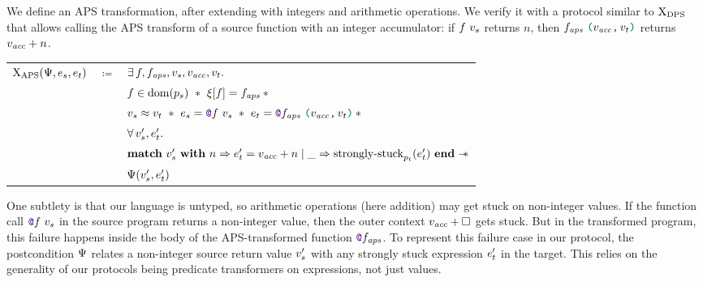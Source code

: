 We define an APS transformation, after extending \DataLang with integers and arithmetic operations. We verify it with a protocol similar to $\mathrm{X}_\mathrm{DPS}$ that allows calling the APS transform of a source function with an integer accumulator: if $\datalangCall{\datalangFn}{\datalangVal_s}$ returns $n$, then $\datalangCall{\datalangFn_\mathit{aps}}{\datalangPair{\datalangVal_{\mathit{acc}}}{\datalangVal_t}}$ returns $\datalangVal_\mathit{acc} + n$.

\medskip
\begin{tabular}{rcl}
        $\iProt_\mathrm{APS} (\iPredTwo, \datalangExpr_s, \datalangExpr_t)$
        & $\coloneqq$ &
        $\exists \datalangFn, \datalangFn_\mathit{aps}, \datalangVal_s, \datalangVal_\mathit{acc}, \datalangVal_t \ldotp$
    \\
        &&
        $\datalangFn \in \dom{\datalangProg_s}
        \ \iSep\ %
        \datalangRenaming [\datalangFn] = \datalangFn_\mathit{aps}
        \iSep {}$
    \\
        &&
        $\datalangVal_s \iSimilar \datalangVal_t
        \ \iSep\ %
        \datalangExpr_s = \datalangCall{\datalangFnptr{\datalangFn}}{\datalangVal_s}
        \ \iSep\ %
        \datalangExpr_t = \datalangCall{\datalangFnptr{\datalangFn_\mathit{aps}}}{\datalangPair{\datalangVal_\mathit{acc}}{\datalangVal_t}}
        \iSep {}$
    \\
        &&
        $\forall \datalangVal_s', \datalangExpr_t' \ldotp$
    \\
        &&
        $\bm{\mathrm{match}}\ \datalangVal_s'\ \bm{\mathrm{with}}\ \datalangNat \Rightarrow \datalangExpr_t' = \datalangVal_\mathit{acc} + \datalangNat \mid \_ \Rightarrow \mathrm{strongly \mathhyphen stuck}_{\datalangProg_t} (\datalangExpr_t')\ \bm{\mathrm{end}} \iWand$
    \\
        &&
        $\iPredTwo (\datalangVal_s', \datalangExpr_t')$
\end{tabular}
\medskip
{}

One subtlety is that our \DataLang language is untyped, so arithmetic operations (here addition) may get stuck on non-integer values. If the function call $\datalangCall {\datalangFnptr \datalangFn} {\datalangVal_s}$ in the source program returns a non-integer value, then the outer context $\datalangVal_\mathit{acc} + \datalangCtxHole$ gets stuck. But in the transformed program, this failure happens inside the body of the APS-transformed function $\datalangFnptr {\datalangFn_\mathit{aps}}$. To represent this failure case in our protocol, the postcondition $\Psi$ relates a non-integer source return value $\datalangVal_s'$ with any strongly stuck expression $\datalangExpr_t'$ in the target. This relies on the generality of our protocols being predicate transformers on expressions, not just values.

